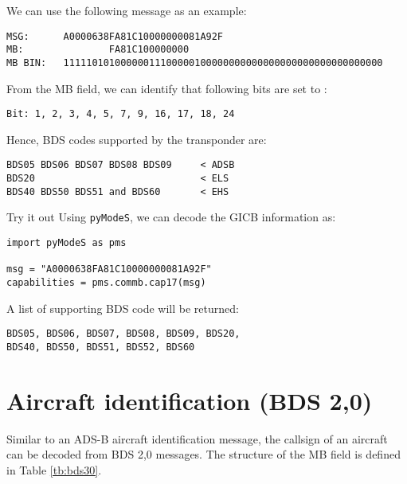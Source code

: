 We can use the following message as an example:

\begin{verbatim}
MSG:      A0000638FA81C10000000081A92F
MB:               FA81C100000000
MB BIN:   11111010100000011100000100000000000000000000000000000000
\end{verbatim}

From the MB field, we can identify that following bits are set to \1:

\begin{verbatim}
Bit: 1, 2, 3, 4, 5, 7, 9, 16, 17, 18, 24
\end{verbatim}

Hence, BDS codes supported by the transponder are: 
\begin{verbatim}
BDS05 BDS06 BDS07 BDS08 BDS09     < ADSB
BDS20                             < ELS
BDS40 BDS50 BDS51 and BDS60       < EHS
\end{verbatim}
  
\begin{notebox}{Try it out}
Using \texttt{pyModeS}, we can decode the GICB information as: 

\begin{verbatim}
import pyModeS as pms

msg = "A0000638FA81C10000000081A92F"
capabilities = pms.commb.cap17(msg)
\end{verbatim}

A list of supporting BDS code will be returned:

\begin{verbatim}
BDS05, BDS06, BDS07, BDS08, BDS09, BDS20, 
BDS40, BDS50, BDS51, BDS52, BDS60
\end{verbatim}

\end{notebox}

\clearpage

\section{Aircraft identification (BDS 2,0)}

Similar to an ADS-B aircraft identification message, the callsign of an aircraft can be decoded from BDS 2,0 messages. The structure of the MB field is defined in Table \ref{tb:bds30}.


